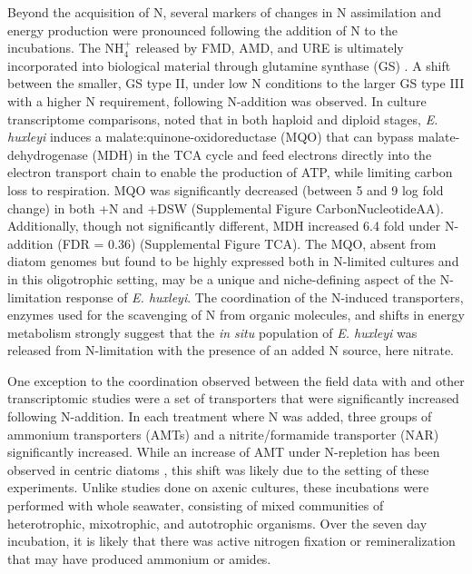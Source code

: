 Beyond the acquisition of N, several markers of changes in N assimilation and energy production were pronounced following the addition of N to the incubations. The NH$_{4}^+$ released by FMD, AMD, and URE is ultimately incorporated into biological material through glutamine synthase (GS) \citep{Rokitta2014}. A shift between the smaller, GS type II, under low N conditions to the larger GS type III with a higher N requirement, following N-addition was observed. In culture transcriptome comparisons, \citet{Rokitta2014} noted that in both haploid and diploid stages, \textit{E. huxleyi} induces a malate:quinone-oxidoreductase (MQO) that can bypass malate-dehydrogenase (MDH) in the TCA cycle and feed electrons directly into the electron transport chain to enable the production of ATP, while limiting carbon loss to respiration. MQO was significantly decreased (between 5 and 9 log fold change) in both +N and +DSW (Supplemental Figure CarbonNucleotideAA). Additionally, though not significantly different, MDH increased 6.4 fold under N-addition (FDR = 0.36) (Supplemental Figure TCA). The MQO, absent from diatom genomes but found to be highly expressed both in N-limited cultures and in this oligotrophic setting, may be a unique and niche-defining aspect of the N-limitation response of \textit{E. huxleyi}. The coordination of the N-induced transporters, enzymes used for the scavenging of N from organic molecules, and shifts in energy metabolism strongly suggest that the \textit{in situ} population of \textit{E. huxleyi} was released from N-limitation with the presence of an added N source, here nitrate.\par

One exception to the coordination observed between the field data with \citet{McKew2015} and other transcriptomic studies \citep{Dyhrman2006, Rokitta2014} were a set of transporters that were significantly increased following N-addition. In each treatment where N was added, three groups of ammonium transporters (AMTs) and a nitrite/formamide transporter (NAR) significantly increased. While an increase of AMT under N-repletion has been observed in centric diatoms \citep{Bender2014}, this shift was likely due to the setting of these experiments. Unlike studies done on axenic cultures, these incubations were performed with whole seawater, consisting of mixed communities of heterotrophic, mixotrophic, and autotrophic organisms. Over the seven day incubation, it is likely that there was active nitrogen fixation \citep{Karl1997} or remineralization \citep{Casciotti2008} that may have produced ammonium or amides. \par

